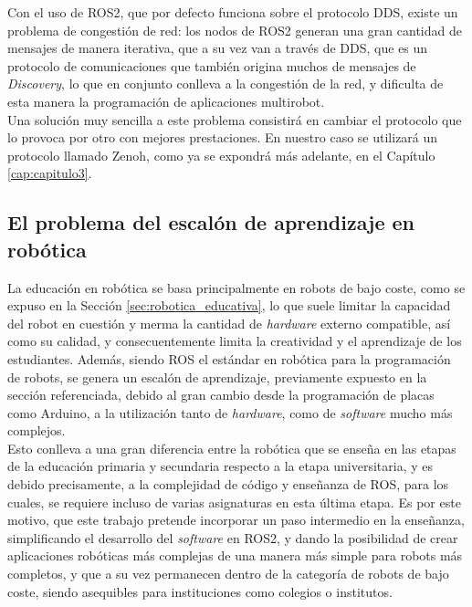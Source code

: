 Con el uso de ROS2, que por defecto funciona sobre el protocolo DDS, existe un
problema de congestión de red: los nodos de ROS2 generan una gran cantidad de
mensajes de manera iterativa, que a su vez van a través de DDS, que es un
protocolo de comunicaciones que también origina muchos de mensajes de
\textit{Discovery}, lo que en conjunto conlleva a la congestión de la red, y
dificulta de esta manera la programación de aplicaciones multirobot.
\\

Una solución muy sencilla a este problema consistirá en cambiar el protocolo que
lo provoca por otro con mejores prestaciones.
En nuestro caso se utilizará un protocolo llamado Zenoh, como ya se expondrá más
adelante, en el Capítulo \ref{cap:capitulo3}.


\subsection{El problema del escalón de aprendizaje en robótica}
\label{sec:problema_escalon}

La educación en robótica se basa principalmente en robots de bajo coste, como se
expuso en la Sección \ref{sec:robotica_educativa}, lo que suele limitar la
capacidad del robot en cuestión y merma la cantidad de \textit{hardware} externo
compatible, así como su calidad, y consecuentemente limita la creatividad y el
aprendizaje de los estudiantes.
Además, siendo ROS el estándar en robótica para la programación de robots,
se genera un escalón de aprendizaje, previamente expuesto en la sección
referenciada, debido al gran cambio desde la programación de placas como
Arduino, a la utilización tanto de \textit{hardware}, como de \textit{software}
mucho más complejos.
\\

Esto conlleva a una gran diferencia entre la robótica que se enseña en las
etapas de la educación primaria y secundaria respecto a la etapa universitaria,
y es debido precisamente, a la complejidad de código y enseñanza de ROS, para
los cuales, se requiere incluso de varias asignaturas en esta última etapa.
Es por este motivo, que este trabajo pretende incorporar un paso intermedio en
la enseñanza, simplificando el desarrollo del  \textit{software} en ROS2, y
dando la posibilidad de crear aplicaciones robóticas más complejas de una manera
más simple para robots más completos, y que a su vez permanecen dentro de la
categoría de robots de bajo coste, siendo asequibles para instituciones como
colegios o institutos.


